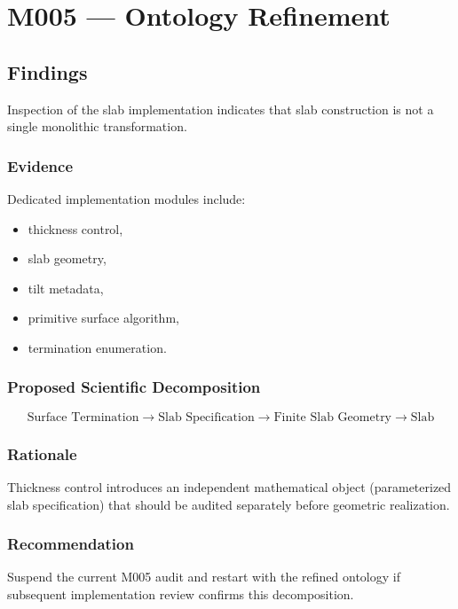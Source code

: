 \chapter{M005 --- Ontology Refinement}

\section{Findings}

Inspection of the slab implementation indicates that slab construction is
not a single monolithic transformation.

\subsection{Evidence}

Dedicated implementation modules include:

\begin{itemize}
\item thickness control,
\item slab geometry,
\item tilt metadata,
\item primitive surface algorithm,
\item termination enumeration.
\end{itemize}

\subsection{Proposed Scientific Decomposition}

\[
\text{Surface Termination}
\rightarrow
\text{Slab Specification}
\rightarrow
\text{Finite Slab Geometry}
\rightarrow
\text{Slab}
\]

\subsection{Rationale}

Thickness control introduces an independent mathematical object
(parameterized slab specification) that should be audited separately
before geometric realization.

\subsection{Recommendation}

Suspend the current M005 audit and restart with the refined ontology if
subsequent implementation review confirms this decomposition.
